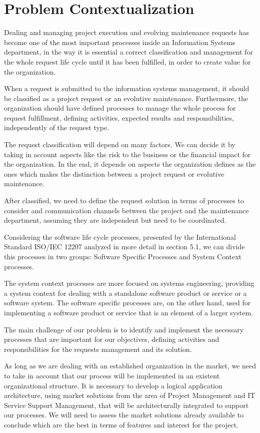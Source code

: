 
% 
% 

\section{Problem Contextualization}


Dealing and managing project execution and evolving maintenance requests has become one of the most important processes inside an Information Systems department, in the way it is essential a correct classification and management for the whole request life cycle until it has been fulfilled, in order to create value for the organization.\par
When a request is submitted to the information systems management, it should be classified as a project request or an evolutive maintenance. Furthermore, the organization should have defined processes to manage the whole process for request fulfillment, defining activities, expected results and responsibilities, independently of the request type.\par
The request classification will depend on many factors. We can decide it by taking in account aspects like the risk to the business or the financial impact for the organization. In the end, it depends on aspects the organization defines as the ones which makes the distinction between a project request or evolutive maintenance.\par
After classified, we need to define the request solution in terms of processes to consider and communication channels between the project and the maintenance department, assuming they are independent but need to be coordinated.\par
Considering the software life cycle processes, presented by the International Standard ISO/IEC 12207\cite{ISO12207} analyzed in more detail in section 5.1, we can divide this processes in two groups: Software Specific Processes and System Context processes.\par
The system context processes are more focused on systems engineering, providing a system context for dealing with a standalone software product or service or a software system. The software specific processes are, on the other hand, used for implementing a software product or service that is an element of a larger system. \par 
The main challenge of our problem is to identify and implement the necessary processes that are important for our objectives, defining activities and responsibilities for the requests management and its solution.\par
As long as we are dealing with an established organization in the market, we need to take in account that our process will be implemented in an existent organizational structure. It is necessary to develop a logical application architecture, using market solutions from the area of Project Management and IT Service Support Management, that will be architecturally integrated to support our processes. We will need to assess the market solutions already available to conclude which are the best in terms of features and interest for the project. 
